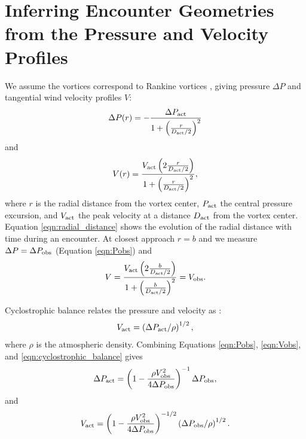 \documentclass{aastex63}
\begin{document}
\section{Inferring Encounter Geometries from the Pressure and Velocity Profiles}
\label{sec:Inferring Encounter Geometries from the Pressure and Velocity Profiles}
We assume the vortices correspond to Rankine vortices \citep{1991ExFl...11...73V}, giving pressure $\Delta P$ and tangential wind velocity profiles $V$:
\begin{equation}
    \Delta P(r) = -\frac{\Delta P_{\rm act}}{1 + \left( \frac{r}{D_{\rm act}/2} \right)^2}\label{eqn:radial_lorentzian_profile}
\end{equation}
and
\begin{equation}
    V(r) = \frac{ V_{\rm act} \left( 2 \frac{r}{D_{\rm act}/2} \right)}{1 + \left( \frac{r}{D_{\rm act}/2} \right)^2},\label{eqn:radial_wind_profile}
\end{equation}
where $r$ is the radial distance from the vortex center, $P_{\rm act}$ the central pressure excursion, and $V_{\rm act}$ the peak velocity at a distance $D_{\rm act}$ from the vortex center. Equation \ref{eqn:radial_distance} shows the evolution of the radial distance with time during an encounter. At closest approach $r = b$ and we measure $\Delta P = \Delta P_{\rm obs}$ (Equation \ref{eqn:Pobs}) and 
\begin{equation}
    V = \frac{ V_{\rm act} \left( 2\frac{b}{D_{\rm act}/2} \right)}{1 + \left( \frac{b}{D_{\rm act}/2} \right)^2} = V_{\rm obs}.\label{eqn:Vobs}
\end{equation} 

Cyclostrophic balance relates the pressure and velocity as \citep{2020Icar..33813523J}:
\begin{equation}
    V_{\rm act} = \left( \Delta P_{\rm act}/\rho \right)^{1/2},\label{eqn:cyclostrophic_balance}
\end{equation}
where $\rho$ is the atmospheric density. Combining Equations \ref{eqn:Pobs}, \ref{eqn:Vobs}, and \ref{eqn:cyclostrophic_balance} gives
\begin{equation}
    \Delta P_{\rm act} = \left( 1 - \frac{\rho V_{\rm obs}^2}{4 \Delta P_{\rm obs}} \right)^{-1} \Delta P_{\rm obs},\label{eqn:solution_for_Pact}
\end{equation}
and
\begin{equation}
    V_{\rm act} = \left( 1 - \frac{\rho V_{\rm obs}^2}{4 \Delta P_{\rm obs}} \right)^{-1/2} \left( \Delta P_{\rm obs}/\rho \right)^{1/2}.\label{eqn:solution_for_Vact}
\end{equation}
\end{document}

